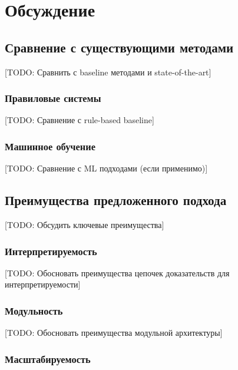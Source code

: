 
\chapter{Обсуждение}
\label{ch:discussion}

\section{Сравнение с существующими методами}
\label{sec:disc:comparison}

[TODO: Сравнить с baseline методами и state-of-the-art]

\subsection{Правиловые системы}
\label{subsec:disc:rule_based}

[TODO: Сравнение с rule-based baseline]

\subsection{Машинное обучение}
\label{subsec:disc:ml}

[TODO: Сравнение с ML подходами (если применимо)]

\section{Преимущества предложенного подхода}
\label{sec:disc:advantages}

[TODO: Обсудить ключевые преимущества]

\subsection{Интерпретируемость}
\label{subsec:disc:interpretability}

[TODO: Обосновать преимущества цепочек доказательств для интерпретируемости]

\subsection{Модульность}
\label{subsec:disc:modularity}

[TODO: Обосновать преимущества модульной архитектуры]

\subsection{Масштабируемость}
\label{subsec:disc:scalability}

